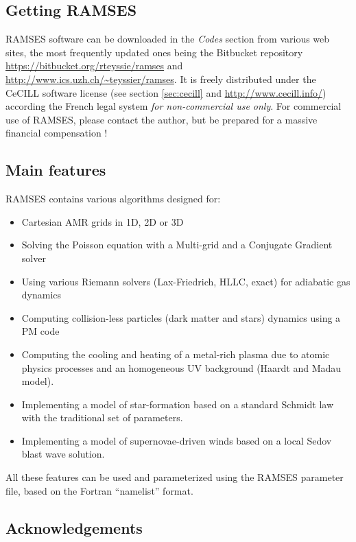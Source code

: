 \subsection{Getting RAMSES}

RAMSES software can be downloaded in the \emph{Codes} section from various web
sites, the most frequently updated ones being the Bitbucket repository
\url{https://bitbucket.org/rteyssie/ramses} and
\url{http://www.ics.uzh.ch/~teyssier/ramses}.  It is freely distributed under the CeCILL
software license (see section \ref{sec:cecill} and
\url{http://www.cecill.info/}) according the French legal system \emph{for
non-commercial use only}. For commercial use of RAMSES, please contact the
author, but be prepared for a massive financial compensation !

\subsection{Main features}
RAMSES contains various algorithms designed for:

\begin{itemize}
   \item Cartesian AMR grids in 1D, 2D or 3D
   \item Solving the Poisson equation with a Multi-grid and a Conjugate
Gradient solver
   \item Using various Riemann solvers (Lax-Friedrich, HLLC, exact) for
adiabatic gas dynamics
   \item Computing collision-less particles (dark matter and stars)
dynamics using a PM code
   \item Computing the cooling and heating of a metal-rich plasma due to
atomic physics processes and an homogeneous UV background (Haardt and
Madau model).
   \item Implementing a model of star-formation based on a standard
Schmidt law with the traditional set of parameters.
   \item Implementing a model of supernovae-driven winds based on a
local Sedov blast wave solution.
\end{itemize}

All these features can be used and parameterized using the RAMSES
parameter file, based on the Fortran ``namelist'' format.

\subsection{Acknowledgements}

